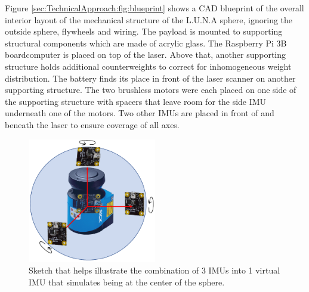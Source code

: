 Figure \ref{sec:TechnicalApproach:fig:blueprint} shows a CAD blueprint of the overall interior layout of the mechanical structure of the L.U.N.A sphere, ignoring the outside sphere, flywheels and wiring.
The payload is mounted to supporting structural components which are made of acrylic glass.
The Raspberry Pi 3B boardcomputer is placed on top of the laser.
Above that, another supporting structure holds additional counterweights to correct for inhomogeneous weight distribution.                                                                                                     
The battery finds its place in front of the laser scanner on another supporting structure.
The two brushless motors were each placed on one side of the supporting structure with spacers that leave room for the side IMU underneath one of the motors.
Two other IMUs are placed in front of and beneath the laser to ensure coverage of all axes.                                                                                 

\begin{figure}                                                                                                                                                                                                    
\centering
\includegraphics[width=0.5\textwidth]{../Media/virtualIMU.png}                                                                                                                                                      
\caption{Sketch that helps illustrate the combination of 3 IMUs into 1 virtual IMU that simulates being at the center of the sphere.}                                                                                                                           
\label{sec:SensorIntegration:fig:virtual}                                                                                                                                                                       
\end{figure}                                                                                                                                                                                                      

